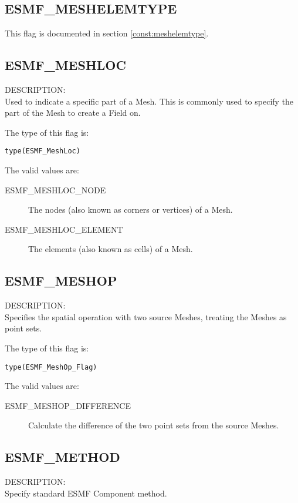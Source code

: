 \subsection{ESMF\_MESHELEMTYPE}
This flag is documented in section \ref{const:meshelemtype}.

\subsection{ESMF\_MESHLOC}
\label{const:meshloc}
{\sf DESCRIPTION:\\}  
Used to indicate a specific part of a Mesh. This is commonly used to specify the part of the Mesh to
create a Field on. 

The type of this flag is:

{\tt type(ESMF\_MeshLoc)}

The valid values are:
\begin{description}

\item [ESMF\_MESHLOC\_NODE]
         The nodes (also known as corners or vertices) of a Mesh. 

\item [ESMF\_MESHLOC\_ELEMENT]
         The elements (also known as cells) of a Mesh. 
\end{description}


\subsection{ESMF\_MESHOP}
\label{const:meshop}
{\sf DESCRIPTION:\\}  
 Specifies the spatial operation with two source Meshes, treating the Meshes as point sets.

The type of this flag is:

{\tt type(ESMF\_MeshOp\_Flag)}

The valid values are:
\begin{description}

\item [ESMF\_MESHOP\_DIFFERENCE]
         Calculate the difference of the two point sets from the source Meshes.
\end{description}

\subsection{ESMF\_METHOD}
\label{const:method}

{\sf DESCRIPTION:\\}  
Specify standard ESMF Component method.

